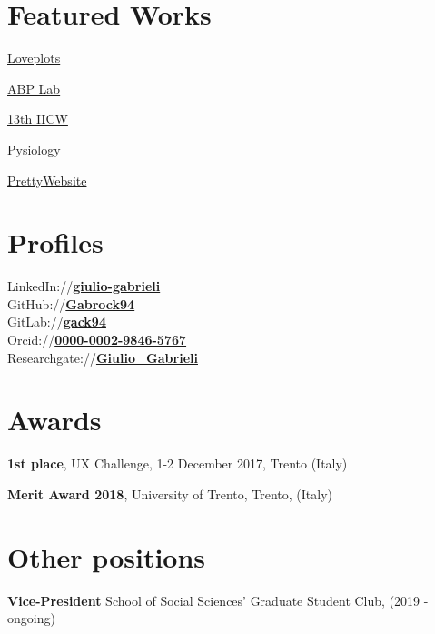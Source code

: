 \documentclass[a4paper]{deedy-resume} %
\begin{document}
\begin{minipage}[t]{0.28\textwidth}
\section{Featured Works}
\vspace{\topsep} %
\begin{tightitemize}
\item \href{http://loveplot.tk}{Loveplots}
\item \href{http://abp.dipsco.unitn.it}{ABP Lab}
\item \href{http://abp.dipsco.unitn.it/iicw}{13th IICW}
\item \href{https://github.com/Gabrock94/Pysiology}{Pysiology}
\item \href{https://github.com/Gabrock94/PrettyWebsite}{PrettyWebsite}
\end{tightitemize}
\sectionspace %
\fi

\section{Profiles}
LinkedIn://\textbf{\href{https://www.linkedin.com/in/giulio-gabrieli-a48b3a73}{giulio-gabrieli}}\\
GitHub://\textbf{\href{https://github.com/Gabrock94}{Gabrock94}}\\
GitLab://\textbf{\href{https://gitlab.com/gack94}{gack94}}\\
Orcid://\textbf{\href{https://orcid.org/0000-0002-9846-5767}{0000-0002-9846-5767}}\\
Researchgate://\textbf{\href{https://www.researchgate.net/profile/Giulio_Gabrieli}{Giulio\_Gabrieli}}\\
\sectionspace %

\section{Awards}
\sectionspace
\begin{tightitemize}
	\item \textbf{1st place}, UX Challenge, 1-2 December 2017, Trento (Italy)
	\item \textbf{Merit Award 2018}, University of Trento, Trento, (Italy)
\end{tightitemize}


\section{Other positions}
\sectionspace
\begin{tightitemize}
	\item \textbf{Vice-President} School of Social Sciences' Graduate Student Club, (2019 - ongoing)
\end{tightitemize}
\end{minipage} %
\end{document}

